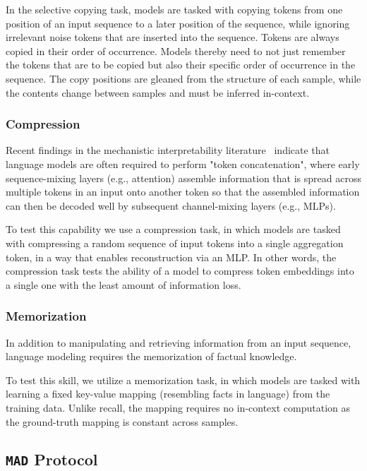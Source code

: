 In the selective copying task, models are tasked with copying tokens from one position of an input sequence to a later position of the sequence, while ignoring irrelevant noise tokens that are inserted into the sequence. Tokens are always copied in their order of occurrence. Models thereby need to not just remember the tokens that are to be copied but also their specific order of occurrence in the sequence. The copy positions are gleaned from the structure of each sample, while the contents change between samples and must be inferred in-context.

\subsubsection{Compression}

Recent findings in the mechanistic interpretability literature~\cite{nanda2023fact} indicate that language models are often required to perform "token concatenation", where early sequence-mixing layers (e.g., attention) assemble information that is spread across multiple tokens in an input onto another token so that the assembled information can then be decoded well by subsequent channel-mixing layers (e.g., MLPs). 

To test this capability we use a compression task, in which models are tasked with compressing a random sequence of input tokens into a single aggregation token, in a way that enables reconstruction via an MLP. In other words, the compression task tests the ability of a model to compress token embeddings into a single one with the least amount of information loss. 

\subsubsection{Memorization}

In addition to manipulating and retrieving information from an input sequence, language modeling requires the memorization of factual knowledge.

To test this skill, we utilize a memorization task, in which models are tasked with learning a fixed key-value mapping (resembling facts in language) from the training data. Unlike recall, the mapping requires no in-context computation as the ground-truth mapping is constant across samples. 

\subsection{{\tt MAD} Protocol}

